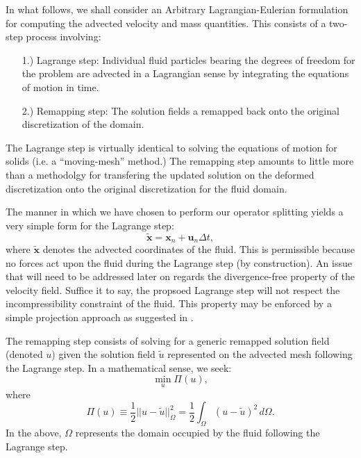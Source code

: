\documentclass[12pt]{article}
\begin{document}
In what follows, we shall consider an Arbitrary Lagrangian-Eulerian formulation for computing the advected velocity and mass quantities. This consists of a two-step process involving:
\begin{itemize}
\item[1.)] Lagrange step: Individual fluid particles bearing the degrees of freedom for the problem are advected in a Lagrangian sense by integrating the equations of motion in time.
\item[2.)] Remapping step: The solution fields a remapped back onto the original discretization of the domain.
\end{itemize}
The Lagrange step is virtually identical to solving the equations of motion for solids (i.e. a ``moving-mesh'' method.) The remapping step amounts to little more than a methodolgy for transfering the updated solution on the deformed discretization onto the original discretization for the fluid domain.

The manner in which we have chosen to perform our operator splitting yields a very simple form for the Lagrange step:
\begin{equation}
  \tilde{\mathbf{x}} = \mathbf{x}_n + \mathbf{u}_n \Delta t,
\end{equation}
where $\tilde{\mathbf{x}}$ denotes the advected coordinates of the fluid. This is permissible because no forces act upon the fluid during the Lagrange step (by construction). An issue that will need to be addressed later on regards the divergence-free property of the velocity field. Suffice it to say, the propsoed Lagrange step will not respect the incompressibility constraint of the fluid. This property may be enforced by a simple projection approach as suggested in \cite{stam_2003}.

The remapping step consists of solving for a generic remapped solution field (denoted $u$) given the solution field $\tilde{u}$ represented on the advected mesh following the Lagrange step. In a mathematical sense, we seek:
\begin{equation}
  \min_{u} \Pi(u),
  \label{eq:potential}
\end{equation}
where
\begin{equation}
  \Pi(u) \equiv \frac{1}{2} || u - \tilde{u} ||^2_{\Omega} = \frac{1}{2} \int_{\Omega} (u - \tilde{u})^2 \, d \Omega.
\end{equation}
In the above, $\Omega$ represents the domain occupied by the fluid following the Lagrange step.
\end{document}
